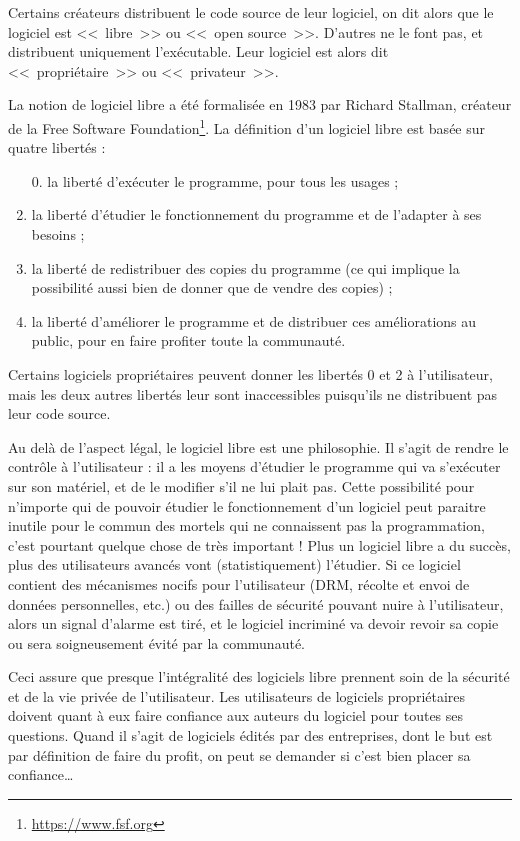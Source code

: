 Certains créateurs distribuent le code source de leur logiciel, on dit alors que le logiciel est <<~libre~>> ou <<~open source~>>.
D'autres ne le font pas, et distribuent uniquement l'exécutable.
Leur logiciel est alors dit <<~propriétaire~>> ou <<~privateur~>>.

La notion de logiciel libre a été formalisée en 1983 par Richard Stallman, créateur de la Free Software Foundation\footnote{\url{https://www.fsf.org}}.
La définition d'un logiciel libre est basée sur quatre libertés :

\begin{enumerate}
\item[0.] la liberté d'exécuter le programme, pour tous les usages ;
\item la liberté d'étudier le fonctionnement du programme et de l'adapter à ses besoins ;
\item la liberté de redistribuer des copies du programme (ce qui implique la possibilité aussi bien de donner que de vendre des copies) ;
\item la liberté d'améliorer le programme et de distribuer ces améliorations au public, pour en faire profiter toute la communauté.
\end{enumerate}

Certains logiciels propriétaires peuvent donner les libertés \no{}0 et \no{}2 à l'utilisateur, mais les deux autres libertés leur sont inaccessibles puisqu'ils ne distribuent pas leur code source.

Au delà de l'aspect légal, le logiciel libre est une philosophie.
Il s'agit de rendre le contrôle à l'utilisateur : il a les moyens d'étudier le programme qui va s'exécuter sur son matériel, et de le modifier s'il ne lui plait pas.
Cette possibilité pour n'importe qui de pouvoir étudier le fonctionnement d'un logiciel peut paraitre inutile pour le commun des mortels qui ne connaissent pas la programmation, c'est pourtant quelque chose de très important !
Plus un logiciel libre a du succès, plus des utilisateurs avancés vont (statistiquement) l'étudier.
Si ce logiciel contient des mécanismes nocifs pour l'utilisateur (DRM, récolte et envoi de données personnelles, etc.) ou des failles de sécurité pouvant nuire à l'utilisateur, alors un signal d'alarme est tiré, et le logiciel incriminé va devoir revoir sa copie ou sera soigneusement évité par la communauté.

Ceci assure que presque l'intégralité des logiciels libre prennent soin de la sécurité et de la vie privée de l'utilisateur.
Les utilisateurs de logiciels propriétaires doivent quant à eux faire confiance aux auteurs du logiciel pour toutes ses questions.
Quand il s'agit de logiciels édités par des entreprises, dont le but est par définition de faire du profit, on peut se demander si c'est bien placer sa confiance\dots{}

